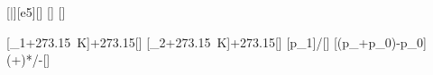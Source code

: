[\bar][e5][\pascal]
[\degreeCelsius]
[\degreeCelsius]

[\vartheta_1+\SI{273.15}{\kelvin}]{\thEiX+273.15}[\kelvin]
[\vartheta_2+\SI{273.15}{\kelvin}]{\thZwX+273.15}[\kelvin]
[p_1\cdot{}]{\pEiX*\TZwX/\TEiX}[\pascal]
[\left(p_+p_0\right)-p_0]{(\pEiX+\ncpoX)*\TZwX/\TEiX-\ncpoX}[\pascal]
